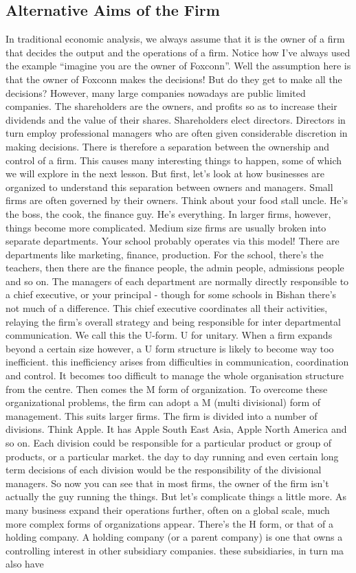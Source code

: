 \documentclass[DIV=calc,11pt,parskip,numbers=noenddot]{scrartcl} %
\begin{document}
\subsection{Alternative Aims of the Firm}
 In traditional economic analysis, we always assume that it is the owner of a firm that decides the output and the operations of a firm. Notice how I’ve always used the example “imagine you are the owner of Foxconn”. Well the assumption here is that the owner of Foxconn makes the decisions! But do they get to make all the decisions? However, many large companies nowadays are public limited companies. The shareholders are the owners, and profits so as to increase their dividends and the value of their shares. Shareholders elect directors. Directors in turn employ professional managers who are often given considerable discretion in making decisions. There is therefore a separation between the ownership and control of a firm. This causes many interesting things to happen, some of which we will explore in the next lesson. But first, let’s look at how businesses are organized to understand this separation between owners and managers. Small firms are often governed by their owners. Think about your food stall uncle. He’s the boss, the cook, the finance guy. He’s everything. In larger firms, however, things become more complicated. Medium size firms are usually broken into separate departments. Your school probably operates via this model! There are departments like marketing, finance, production. For the school, there’s the teachers, then there are the finance people, the admin people, admissions people and so on. The managers of each department are normally directly responsible to a chief executive, or your principal - though for some schools in Bishan there’s not much of a difference. This chief executive coordinates all their activities, relaying the firm’s overall strategy and being responsible for inter departmental communication. We call this the U-form. U for unitary. When a firm expands beyond a certain size however, a U form structure is likely to become way too inefficient. this inefficiency arises from difficulties in communication, coordination and control. It becomes too difficult to manage the whole organisation structure from the centre. Then comes the M form of organization. To overcome these organizational problems, the firm can adopt a M (multi divisional) form of management. This suits larger firms. The firm is divided into a number of divisions. Think Apple. It has Apple South East Asia, Apple North America and so on. Each division could be responsible for a particular product or group of products, or a particular market. the day to day running and even certain long term decisions of each division would be the responsibility of the divisional managers. So now you can see that in most firms, the owner of the firm isn’t actually the guy running the things. But let’s complicate things a little more. As many business expand their operations further, often on a global scale, much more complex forms of organizations appear. There’s the H form, or that of a holding company. A holding company (or a parent company) is one that owns a controlling interest in other subsidiary companies. these subsidiaries, in turn ma also have 
\end{document}
